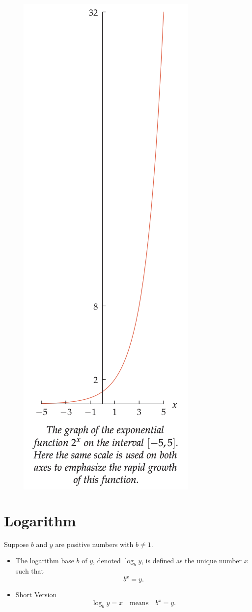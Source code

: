 \begin{figure}
\includegraphics[scale=0.2]{pics/exp-vs-poly2.png}
\end{figure}

\section{Logarithm}
Suppose \(b\) and \(y\) are positive numbers with \(b\neq 1\).
\begin{itemize}
  \item The logarithm base \(b\) of \(y\), denoted \(\log_b y\), is defined as the unique number \(x\) such that
  \[ b^x = y. \]
  \item  Short Version
  \[ \log_b y = x \quad \text{means} \quad b^x = y. \]
\end{itemize}

